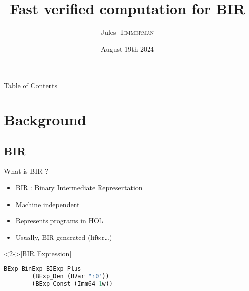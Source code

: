 \documentclass{beamer}
\title{Fast verified computation for BIR}
\date{August 19th 2024}
\author{Jules~\textsc{Timmerman}}
\begin{document}
\begin{frame}{\phantom{}}
  \maketitle
\end{frame}

\begin{frame}{Table of Contents}
  \tableofcontents
\end{frame}

\section{Background}


\subsection{BIR}

\begin{frame}[fragile]{What is BIR ?}
  \begin{itemize}
    \item BIR : Binary Intermediate Representation
    \item Machine independent 
    \item Represents programs in HOL
    \item Usually, BIR generated (lifter…)
  \end{itemize}

  \begin{example}<2->[BIR Expression]
    \begin{lstlisting}[language=Caml]
      BExp_BinExp BIExp_Plus
        (BExp_Den (BVar "r0"))
        (BExp_Const (Imm64 1w))
    \end{lstlisting}
  \end{example}

\end{frame}
\end{document}
